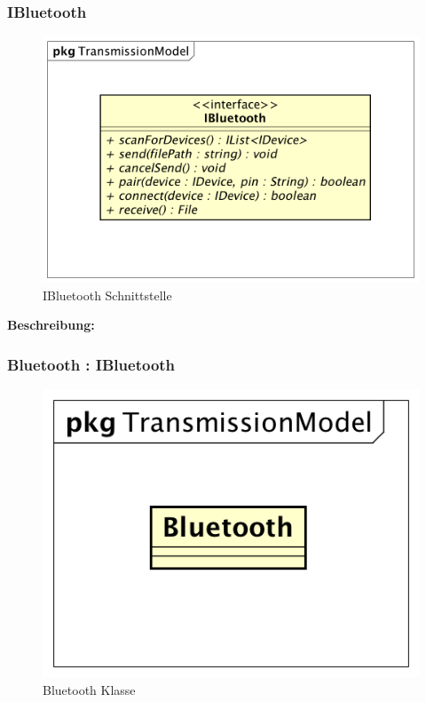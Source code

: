 \documentclass[a4paper]{scrreprt}
\begin{document}
\subsubsection{IBluetooth}
\begin{figure}[H]
\centering
\includegraphics[width=0.55\textheight]{graphics/Klassendiagramme/Model/IBluetooth.png}
\caption{IBluetooth Schnittstelle}
\end{figure}

\textbf{Beschreibung:} 


\subsubsection{Bluetooth : IBluetooth}
\begin{figure}[H]
\centering
\includegraphics[width=0.45\textheight]{graphics/Klassendiagramme/Model/Bluetooth.png}
\caption{Bluetooth Klasse}
\end{figure}
\end{document}
